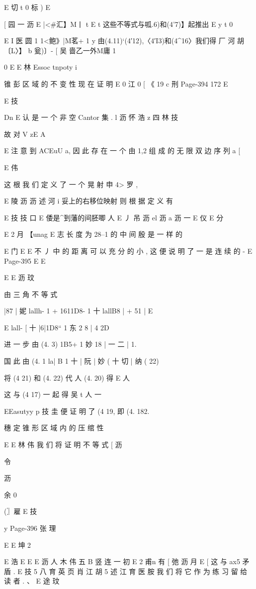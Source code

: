 {{{{{{{{{{{{E 切
t 0 标 )
E

[ 园 一
沥
E |<#汇】M丨 t
E t
这些不等式与呱.6)和(4'7)】起推出
E y
t 0

E
I 医 圆 1 1<鲍》|M茗+ 1 y
由(4.11)`(4′12),〈4′I3)和(4^16〉我们得
厂 河 胡 〔L〉】 b 瓮)〕- [ 吴 啬乙一外M庸 1

0
E
E 林
Essoc tnpoty i

锥 彭 区 域 的 不 变 性
现 在 证 明
E 0
江
0
[ 《 19
c 刑
Page-394
172 E

E
技

Dn
E 认
是 一 个 非 空 Cantor 集 .
l 沥 怀 浩 z 四 林 技

故 对 V zE A

E
注 意 到 ACEuU a, 因 此 存 在 一 个 由 1,2 组 成 的 无 限 双 边 序 列 a
[

E 伟

这 根 我 们 定 义 了 一 个 晃 射 申 4> 罗 ,

E
陵 沥 沥 述 河 i 妥上的右移位映射 则 根 据 定 义 有

E 技 技 口
E 倭是^到藩的间胚唧 人
E 丿 吊 沥 el 沥
a 沥 一
E 仪
E 分

E 2 月
【unag E 志
长 度 为 28--1 的 中 间 殷 是 一 样 的

E 门 E
E 不
丿 中 的 距 离 可 以 充 分 的 小 , 这 便 说 明 了 一 是 连 续 的 -
E
Page-395
E E

E
E 沥 玟

由 三 角 不 等 式

|87 | 妮 lallh- 1 + 1611D8- 1 十 lallB8 | + 51 |
E

E
lall- [ 十 |6|1D8“ 1 东 2 8 | 4 2D

进 一 步 由 (4. 3)
1B5+ 1 妙 18 | 一 二 | 1.

国 此 由 (4. 1
la| B 1 十 | 阮 | 妙 ( 十 切 | 纳 ( 22)

将 (4 21) 和 (4. 22) 代 人 (4. 20) 得
E 人

这 与 (4 17) 一 起 得
吴 t 人 一

EEasutyy p 技 圭
便 证 明 了 (4 19, 即 (4. 182.

穗 定 锥 形 区 域 内 的 压 绾 性

E
E 林 伟
我 们 将 证 明 不 等 式
[ 沥

令

沥

余
0

(〗雇
E 技

y
Page-396
张 理

E
E 坤 2

E 浩
E
E
E 沥 人 木 伟 五
B 竖 连 一 初
E 2 甫n 有
[ 弛 沥 月
E
[
这 与 ax5 矛 盾 .
E 技 5 八 育 英 页 肖 江 胡 5 述 江 育
医 胺
我 们 将 它 作 为 练 习 留 给 读 者 . 、
E 途
玟

}}}}}}}}}}}}
